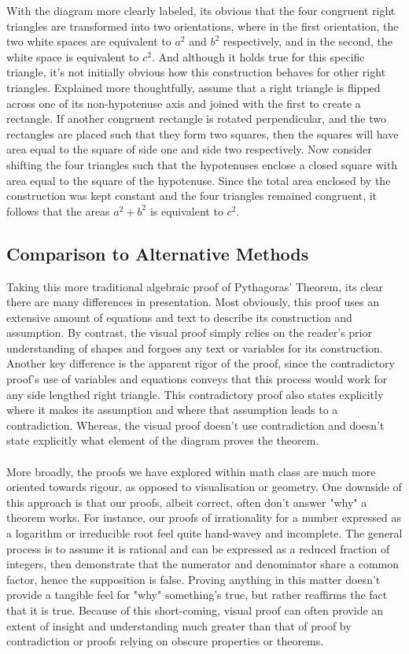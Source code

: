 \documentclass[11pt,a4paper]{article}
\begin{document}
With the diagram more clearly labeled, its obvious that the four congruent right triangles are transformed into two orientations, where in the first orientation, the two white spaces are equivalent to $a^2$ and $b^2$ respectively, and in the second, the white space is equivalent to $c^2$. And although it holds true for this specific triangle, it's not initially obvious how this construction behaves for other right triangles. Explained more thoughtfully, assume that a right triangle is flipped across one of its non-hypotenuse axis and joined with the first to create a rectangle. If another congruent rectangle is rotated perpendicular, and the two rectangles are placed such that they form two squares, then the squares will have area equal to the square of side one and side two respectively. Now consider shifting the four triangles such that the hypotenuses enclose a closed square with area equal to the square of the hypotenuse. Since the total area enclosed by the construction was kept constant and the four triangles remained congruent, it follows that the areas $a^2 +b^2$ is equivalent to $c^2$.
\pagebreak
\subsection{Comparison to Alternative Methods}

Taking this more traditional algebraic proof of Pythagoras' Theorem, its clear there are many differences in presentation. Most obviously, this proof uses an extensive amount of equations and text to describe its construction and assumption. By contrast, the visual proof simply relies on the reader's prior understanding of shapes and forgoes any text or variables for its construction. Another key difference is the apparent rigor of the proof, since the contradictory proof's use of variables and equations conveys that this process would work for any side lengthed right triangle. This contradictory proof also states explicitly where it makes its assumption and where that assumption leads to a contradiction. Whereas, the visual proof doesn't use contradiction and doesn't state explicitly what element of the diagram proves the theorem.\\ \\
More broadly, the proofs we have explored within math class are much more oriented towards rigour, as opposed to visualisation or geometry. One downside of this approach is that our proofs, albeit correct, often don't answer "why" a theorem works. For instance, our proofs of irrationality for a number expressed as a logarithm or irreducible root feel quite hand-wavey and incomplete. The general process is to assume it is rational and can be expressed as a reduced fraction of integers, then demonstrate that the numerator and denominator share a common factor, hence the supposition is false. Proving anything in this matter doesn't provide a tangible feel for "why" something's true, but rather reaffirms the fact that it is true. Because of this short-coming, visual proof can often provide an extent of insight and understanding much greater than that of proof by contradiction or proofs relying on obscure properties or theorems.
\end{document}
